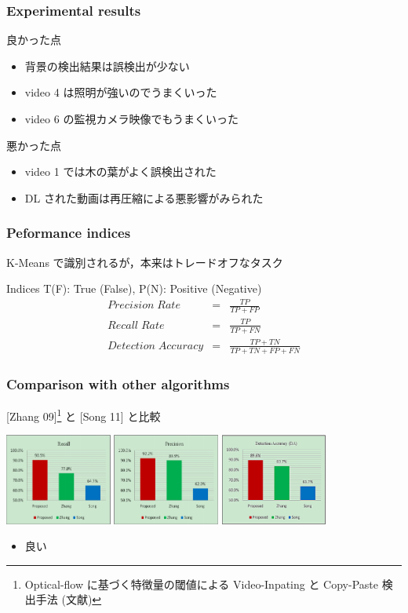 \begin{frame}\frametitle{Experimental results}
\begin{block}{良かった点}
\begin{itemize}
  \item 背景の検出結果は誤検出が少ない
  \item video 4 は照明が強いのでうまくいった
  \item video 6 の監視カメラ映像でもうまくいった
\end{itemize}
\end{block}
\begin{alertblock}{悪かった点}
\begin{itemize}
  \item video 1 では木の葉がよく誤検出された
  \item DL された動画は再圧縮による悪影響がみられた
\end{itemize}
\end{alertblock}
\end{frame}


\begin{frame}\frametitle{Peformance indices}
K-Means で識別されるが，本来はトレードオフなタスク
\begin{block}{Indices}
T(F): True (False),\; P(N): Positive (Negative) 
\begin{eqnarray}
    Precision \; Rate & = & \frac{TP}{TP + FP} \\
    Recall \; Rate & = & \frac{TP}{TP + FN} \\
    Detection \; Accuracy & = & \frac{TP + TN}{TP + TN + FP + FN}
\end{eqnarray}
\end{block}
\end{frame}


\begin{frame}\frametitle{Comparison with other algorithms}
[Zhang 09]\footnote{Optical-flow に基づく特徴量の閾値による Video-Inpating と Copy-Paste 検出手法 (文献\cite{Zhang2009})} と [Song 11] と比較

\includegraphics[height=3cm]{figure/recall_prec.png}
\includegraphics[height=3cm]{figure/accuracy.png}

\begin{itemize}
    \item 良い
\end{itemize}
\end{frame}
